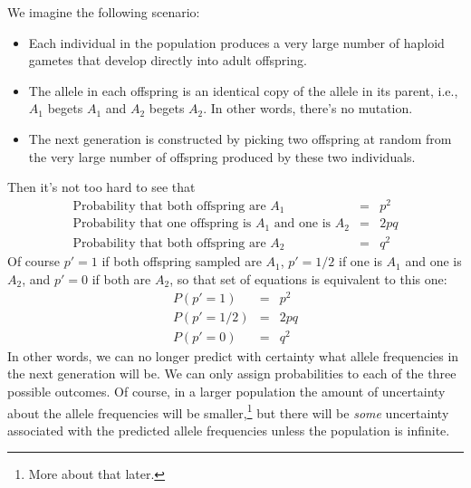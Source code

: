 \documentclass[12pt]{article}
\begin{document}
We imagine the following scenario:

\begin{itemize}

\item Each individual in the population produces a very large number
  of haploid gametes that develop directly into adult offspring.

\item The allele in each offspring is an identical copy of the allele
  in its parent, i.e., $A_1$ begets $A_1$ and $A_2$ begets $A_2$. In
  other words, there's no mutation.

\item The next generation is constructed by picking two offspring at
  random from the very large number of offspring produced by these two
  individuals.

\end{itemize}

\noindent Then it's not too hard to see that
\begin{eqnarray*}
\mbox{Probability that both offspring are $A_1$} &=& p^2 \\
\mbox{Probability that one offspring is $A_1$ and one is $A_2$} &=& 2pq \\
\mbox{Probability that both offspring are $A_2$} &=& q^2
\end{eqnarray*}
Of course $p' = 1$ if both offspring sampled are $A_1$, $p' = 1/2$ if
one is $A_1$ and one is $A_2$, and $p' = 0$ if both are $A_2$, so that
set of equations is equivalent to this one:
\begin{eqnarray}
P(p'=1) &=& p^2  \label{eq:p-1} \\
P(p'=1/2) &=& 2pq \\
P(p'=0) &=& q^2  \label{eq:p-2}
\end{eqnarray}
In other words, we can no longer predict with certainty what allele
frequencies in the next generation will be. We can only assign
probabilities to each of the three possible outcomes. Of course, in a
larger population the amount of uncertainty about the allele
frequencies will be smaller,\footnote{More about that later.} but
there will be {\it some\/} uncertainty associated with the predicted
allele frequencies unless the population is infinite.
\end{document}
